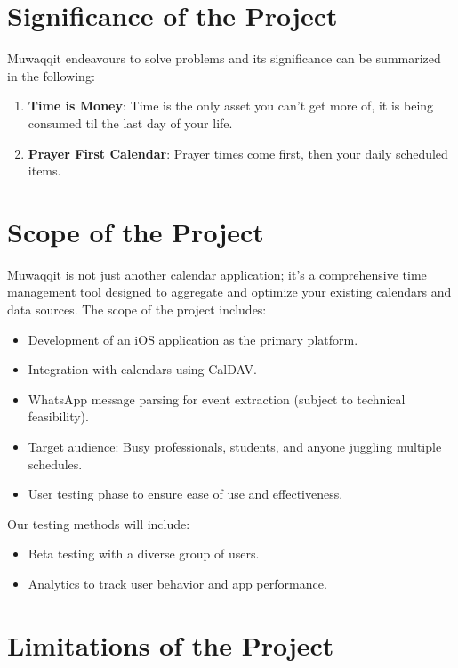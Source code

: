 \documentclass[12pt,a4paper]{article}
\begin{document}
\section{Significance of the Project}

Muwaqqit endeavours to solve problems and its significance can be summarized in the following:

\begin{enumerate}
    \item \textbf{Time is Money}: Time is the only asset you can't get more of, it is being consumed til the last day of your life.
    \item \textbf{Prayer First Calendar}: Prayer times come first, then your daily scheduled items.
\end{enumerate}

\section{Scope of the Project}

Muwaqqit is not just another calendar application; it's a comprehensive time management tool designed to aggregate and optimize your existing calendars and data sources. The scope of the project includes:

\begin{itemize}
    \item Development of an iOS application as the primary platform.
    \item Integration with calendars using CalDAV.
    \item WhatsApp message parsing for event extraction (subject to technical feasibility).
    \item Target audience: Busy professionals, students, and anyone juggling multiple schedules.
    \item User testing phase to ensure ease of use and effectiveness.
\end{itemize}

Our testing methods will include:
\begin{itemize}
    \item Beta testing with a diverse group of users.
    \item Analytics to track user behavior and app performance.
\end{itemize}

\section{Limitations of the Project}
\end{document}
